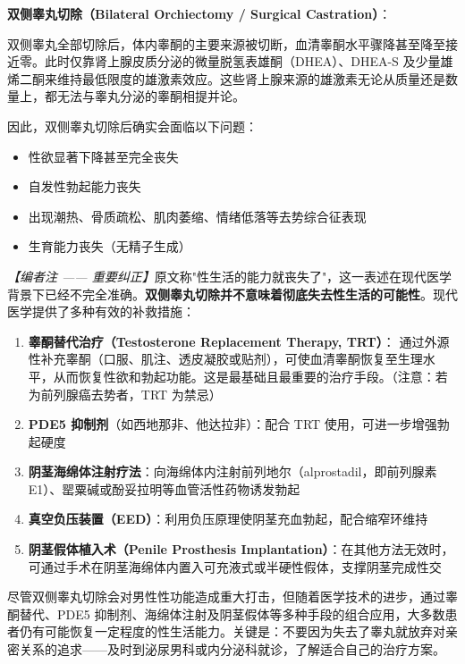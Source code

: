 \documentclass[12pt,a4paper,twoside]{ctexbook}
\begin{document}
\vspace{0.5em}
\noindent\textbf{双侧睾丸切除（Bilateral Orchiectomy / Surgical Castration）}：

双侧睾丸全部切除后，体内睾酮的主要来源被切断，血清睾酮水平骤降甚至降至接近零。此时仅靠肾上腺皮质分泌的微量脱氢表雄酮（DHEA）、DHEA-S 及少量雄烯二酮来维持最低限度的雄激素效应。这些肾上腺来源的雄激素无论从质量还是数量上，都无法与睾丸分泌的睾酮相提并论。

因此，双侧睾丸切除后确实会面临以下问题：
\begin{itemize}
	\item 性欲显著下降甚至完全丧失
	\item 自发性勃起能力丧失
	\item 出现潮热、骨质疏松、肌肉萎缩、情绪低落等去势综合征表现
	\item 生育能力丧失（无精子生成）
\end{itemize}

\noindent\textit{【编者注 —— 重要纠正】}原文称"性生活的能力就丧失了"，这一表述在现代医学背景下已经不完全准确。\textbf{双侧睾丸切除并不意味着彻底失去性生活的可能性}。现代医学提供了多种有效的补救措施：

\begin{enumerate}
	\item \textbf{睾酮替代治疗（Testosterone Replacement Therapy, TRT）}：
	通过外源性补充睾酮（口服、肌注、透皮凝胶或贴剂），可使血清睾酮恢复至生理水平，从而恢复性欲和勃起功能。这是最基础且最重要的治疗手段。（注意：若为前列腺癌去势者，TRT 为禁忌）

	\item \textbf{PDE5 抑制剂}（如西地那非、他达拉非）：配合 TRT 使用，可进一步增强勃起硬度

	\item \textbf{阴茎海绵体注射疗法}：向海绵体内注射前列地尔（alprostadil，即前列腺素 E1）、罂粟碱或酚妥拉明等血管活性药物诱发勃起

	\item \textbf{真空负压装置（EED）}：利用负压原理使阴茎充血勃起，配合缩窄环维持

	\item \textbf{阴茎假体植入术（Penile Prosthesis Implantation）}：在其他方法无效时，可通过手术在阴茎海绵体内置入可充液式或半硬性假体，支撑阴茎完成性交
\end{enumerate}

\begin{tcolorbox}[colback=pink!5!white,colframe=red!50!black,title=贴心小叮咛]
尽管双侧睾丸切除会对男性性功能造成重大打击，但随着医学技术的进步，通过睾酮替代、PDE5 抑制剂、海绵体注射及阴茎假体等多种手段的组合应用，大多数患者仍有可能恢复一定程度的性生活能力。关键是：不要因为失去了睾丸就放弃对亲密关系的追求——及时到泌尿男科或内分泌科就诊，了解适合自己的治疗方案。
\end{tcolorbox}
\end{document}
